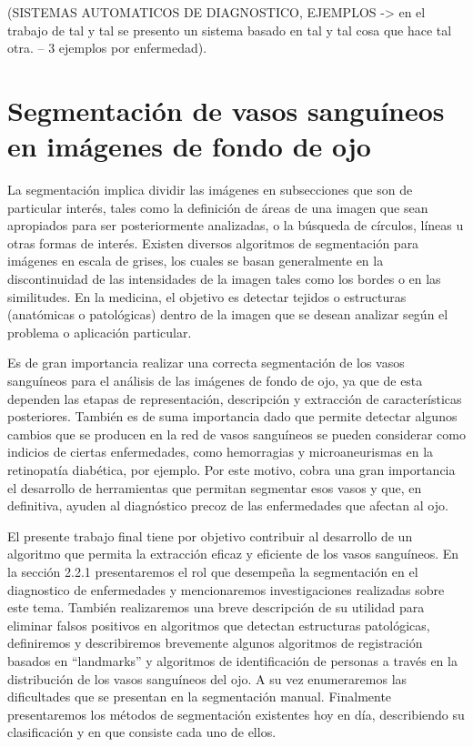 (SISTEMAS AUTOMATICOS DE DIAGNOSTICO, EJEMPLOS -> en el trabajo de tal y tal se presento un sistema basado en tal y tal cosa que hace tal otra.  -- 3 ejemplos por enfermedad).

\section{Segmentaci\'on de vasos sangu\'ineos en im\'agenes de fondo de ojo}
La segmentaci\'on implica dividir las im\'agenes en subsecciones que son de particular inter\'es, tales como la definici\'on de \'areas de una imagen que sean apropiados para ser posteriormente analizadas, o la b\'usqueda de c\'irculos, l\'ineas u otras formas de inter\'es. Existen diversos algoritmos de segmentaci\'on para im\'agenes en escala de grises, los cuales se basan generalmente en la discontinuidad de las intensidades de la imagen tales como los bordes o en las similitudes. En la medicina, el objetivo es detectar tejidos o estructuras (anat\'omicas o patol\'ogicas) dentro de la imagen que se desean analizar seg\'un el problema o aplicaci\'on particular.

Es de gran importancia realizar una correcta segmentaci\'on de los vasos sangu\'ineos para el an\'alisis de las im\'agenes de fondo de ojo, ya que de esta dependen las etapas de representaci\'on, descripci\'on y extracci\'on de caracter\'isticas posteriores.  Tambi\'en es de suma importancia dado que permite detectar algunos cambios que se producen en la red de vasos sangu\'ineos se pueden considerar como indicios de ciertas enfermedades, como hemorragias y microaneurismas en la retinopat\'ia diab\'etica, por ejemplo. Por este motivo, cobra una gran importancia el desarrollo de herramientas que permitan segmentar esos vasos y que, en definitiva, ayuden al diagn\'ostico precoz de las enfermedades que afectan al ojo.

El presente trabajo final tiene por objetivo contribuir al desarrollo de un algoritmo que permita la extracci\'on eficaz y eficiente de los vasos sangu\'ineos. 
En la sección 2.2.1 presentaremos el rol que desempeña la segmentaci\'on en el diagnostico de enfermedades y mencionaremos investigaciones realizadas sobre este tema.  Tambi\'en realizaremos una breve descripci\'on de su utilidad para eliminar falsos positivos en algoritmos que detectan estructuras patol\'ogicas, definiremos y describiremos brevemente algunos algoritmos de registraci\'on basados en “landmarks” y algoritmos de identificaci\'on de personas a trav\'es en la distribuci\'on de los vasos sangu\'ineos del ojo.  A su vez enumeraremos las dificultades que se presentan en la segmentaci\'on manual. Finalmente presentaremos los m\'etodos de segmentaci\'on existentes hoy en d\'ia, describiendo su clasificaci\'on y en que consiste cada uno de ellos.



